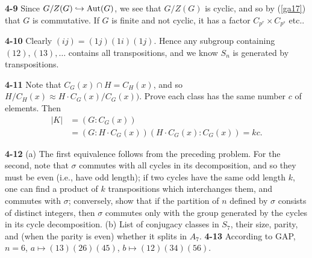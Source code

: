 \documentclass[a4paper,11pt,final,openany]{memoir}%
\theoremstyle{nonumberplain}
\begin{document}
\bigskip\noindent\textbf{4-9}
Since $G/Z(G)\hookrightarrow\operatorname{Aut}(G)$, we see that $G/Z(G)$ is cyclic, and so
by (\ref{ga17}) that $G$ is commutative. If $G$ is finite and not cyclic, it
has a factor $C_{p^{r}}\times C_{p^{s}}$ etc..

\bigskip\noindent\textbf{4-10}
Clearly $(ij)=(1j)(1i)(1j)$. Hence any subgroup containing $(12),(13),\ldots$
contains all transpositions, and we know $S_{n}$ is generated by transpositions.

\bigskip\noindent\textbf{4-11}
Note that $C_{G}(x)\cap H=C_{H}(x)$, and so $H/C_{H}(x)\approx H\cdot
C_{G}(x)/C_{G}(x))$. Prove each class has the same number $c$ of elements.
Then
\begin{align*}
|K|&=(G:C_{G}(x))\\
&=(G:H\cdot C_{G}(x))(H\cdot C_{G}(x):C_{G}(x))=kc.
\end{align*}

\bigskip\noindent\textbf{4-12}
(a) The first equivalence follows from the preceding problem. For the second,
note that $\sigma$ commutes with all cycles in its decomposition, and so they
must be even (i.e., have odd length); if two cycles have the same odd length
$k$, one can find a product of $k$ transpositions which interchanges them, and
commutes with $\sigma$; conversely, show that if the partition of $n$ defined
by $\sigma$ consists of distinct integers, then $\sigma$ commutes only with
the group generated by the cycles in its cycle decomposition. (b) List of
conjugacy classes in $S_{7}$, their size, parity, and (when the parity is
even) whether it splits in $A_{7}$.
\bigskip\noindent\textbf{4-13}
According to GAP, $n=6$, $a\mapsto(13)(26)(45)$, $b\mapsto(12)(34)(56)$.
\end{document}
